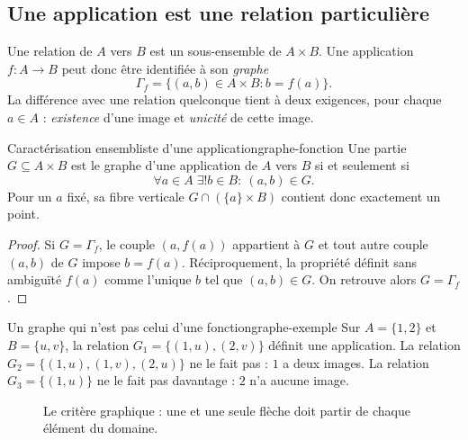 \subsection{Une application est une relation particulière}
Une relation de $A$ vers $B$ est un sous-ensemble de $A\times B$. Une application
$f:A\to B$ peut donc être identifiée à son \emph{graphe}
\[
 \Gamma_f=\{(a,b)\in A\times B:b=f(a)\}.
\]
La différence avec une relation quelconque tient à deux exigences, pour chaque $a\in A$ :
\emph{existence} d'une image et \emph{unicité} de cette image.
\begin{proposition}{Caractérisation ensembliste d'une application}{graphe-fonction}
Une partie $G\subseteq A\times B$ est le graphe d'une application de $A$ vers $B$ si et seulement si
\[
 \forall a\in A\;\exists!b\in B:\ (a,b)\in G.
\]
Pour un $a$ fixé, sa fibre verticale $G\cap(\{a\}\times B)$ contient donc exactement un point.
\end{proposition}
\begin{proof}
Si $G=\Gamma_f$, le couple $(a,f(a))$ appartient à $G$ et tout autre couple $(a,b)$ de $G$ impose $b=f(a)$.
Réciproquement, la propriété définit sans ambiguïté $f(a)$ comme l'unique $b$ tel que $(a,b)\in G$. On retrouve alors $G=\Gamma_f$.
\end{proof}
\begin{exemple}{Un graphe qui n'est pas celui d'une fonction}{graphe-exemple}
Sur $A=\{1,2\}$ et $B=\{u,v\}$, la relation
$G_1=\{(1,u),(2,v)\}$ définit une application. La relation
$G_2=\{(1,u),(1,v),(2,u)\}$ ne le fait pas : $1$ a deux images.
La relation $G_3=\{(1,u)\}$ ne le fait pas davantage : $2$ n'a aucune image.
\end{exemple}
\begin{figure}[htbp]\centering
{}
\caption{Le critère graphique : une et une seule flèche doit partir de chaque élément du domaine.}
\end{figure}


